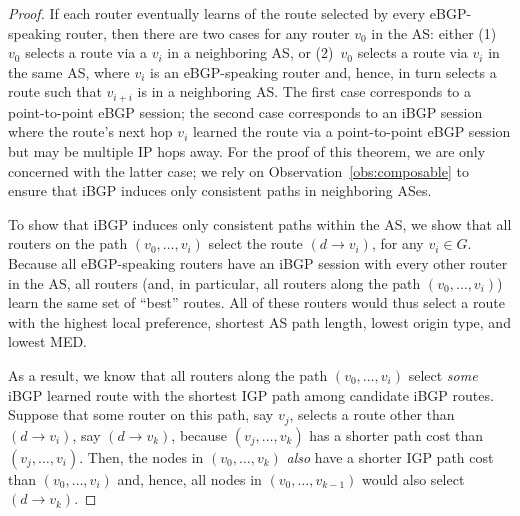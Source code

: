 \begin{proof}
If each router eventually learns of the route selected by every
eBGP-speaking router, then there are two cases for any router $v_0$ in
the AS: either (1)~$v_0$ selects a route via a $v_i$ in a neighboring
AS, or (2)~$v_0$ selects a route via $v_i$ in the same AS, where $v_i$ is an
eBGP-speaking router and, hence, in turn selects a route such that
$v_{i+i}$ is in a neighboring AS.  The first case corresponds to a
point-to-point eBGP session; the second case corresponds to an iBGP
session where the route's next hop $v_i$ learned the route via a
point-to-point eBGP session but may be multiple IP hops away.  For the
proof of this theorem, we are only concerned with the latter case; we
rely on Observation~\ref{obs:composable} to ensure that iBGP induces
only consistent paths in neighboring ASes.


To show that iBGP induces only consistent paths within the AS, we show
that all routers on the path $(v_0, \ldots, v_i)$ select the route $(d
\rightarrow v_i)$, for any $v_i\in G$.  Because all eBGP-speaking
routers have an iBGP session with every other router in the AS, all
routers (and, in particular, all routers along the path $(v_0, \ldots,
v_i)$) learn the same set of ``best'' routes.  All of these routers
would thus select a route with the highest local preference, shortest AS
path length, lowest origin type, and lowest MED.

As a result, we know that all routers along the path $(v_0, \ldots,
v_i)$ select {\em some} iBGP learned route with the shortest IGP path
among candidate iBGP routes.  Suppose that some router on this path, say
$v_j$, selects a route other than $(d \rightarrow v_i)$, say $(d
\rightarrow v_k)$, because $(v_j, \ldots, v_k)$ has a shorter path cost
than $(v_j, \ldots, v_i)$.  Then, the nodes in $(v_0, \ldots, v_k)$ {\em
also} have a shorter IGP path cost than $(v_0, \ldots, v_i)$ and, hence,
all nodes in $(v_0, \ldots, v_{k-1})$ would also select $(d \rightarrow
v_k)$.
\end{proof}

